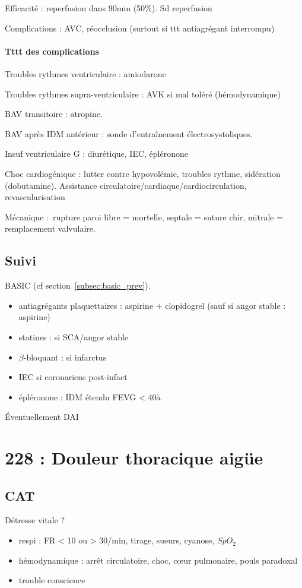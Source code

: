 \documentclass{article}
\begin{document}
Efficacité : reperfusion dans 90min (50\%). Sd reperfusion

Complications : AVC, réocclusion (surtout si ttt antiagrégant interrompu)

\paragraph{Tttt des complications}
Troubles rythmes ventriculaire : amiodarone

Troubles rythmes supra-ventriculaire : AVK si mal toléré (hémodynamique)

BAV transitoire : atropine.

BAV après IDM antérieur : sonde d'entraînement électrosystoliques.

Insuf ventriculaire G : diurétique, IEC, épléronone

Choc cardiogénique : lutter contre {hypovolémie, troubles rythme}, sidération
(dobutamine). Assistance circulatoire/cardiaque/cardiocirculation,
revascularisation

Mécanique : rupture paroi libre = mortelle, septale = suture chir, mitrale =
remplacement valvulaire.

\subsection{Suivi} BASIC (cf section~\ref{subsec:basic_prev}).
\begin{itemize}
  \item antiagrégants plaquettaires : aspirine + clopidogrel (sauf si angor
    stable : aspirine)
  \item statines : si SCA/angor stable
  \item $\beta$-bloquant : si infarctus
  \item IEC si coronariens post-infact
  \item épléronone : IDM étendu FEVG < 40à%
\end{itemize}
Éventuellement DAI

\section{228 : Douleur thoracique aigüe}%
\label{sec:228_douleur_thoracique_aigue}

\subsection{CAT}
Détresse vitale ?
\begin{itemize}
  \item respi : FR < 10 ou > 30/min, tirage, sueurs, cyanose, $SpO_2$
  \item hémodynamique : arrêt circulatoire, choc, c\oe{}ur pulmonaire, pouls
    paradoxal
  \item trouble conscience
\end{itemize}
\end{document}
